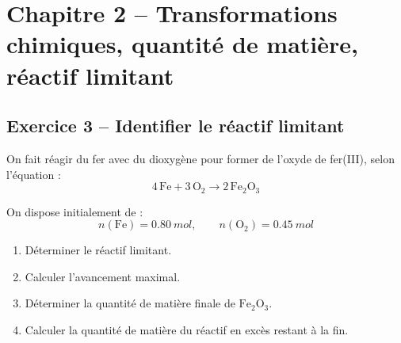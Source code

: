 \documentclass[11pt,a4paper]{article}
\begin{document}
\section{Chapitre 2 -- Transformations chimiques, quantité de matière, réactif limitant}

\subsection{Exercice 3 -- Identifier le réactif limitant}

\begin{enoncebox}
On fait réagir du fer avec du dioxygène pour former de l'oxyde de fer(III), selon l'équation :
\[
4\,\mathrm{Fe} + 3\,\mathrm{O_2} \rightarrow 2\,\mathrm{Fe_2O_3}
\]

On dispose initialement de :
\[
n(\mathrm{Fe}) = \SI{0.80}{mol}, \qquad n(\mathrm{O_2}) = \SI{0.45}{mol}
\]

\begin{enumerate}[label=\arabic*)]
    \item Déterminer le réactif limitant.
    \item Calculer l'avancement maximal.
    \item Déterminer la quantité de matière finale de \(\mathrm{Fe_2O_3}\).
    \item Calculer la quantité de matière du réactif en excès restant à la fin.
\end{enumerate}
\end{enoncebox}
\end{document}

